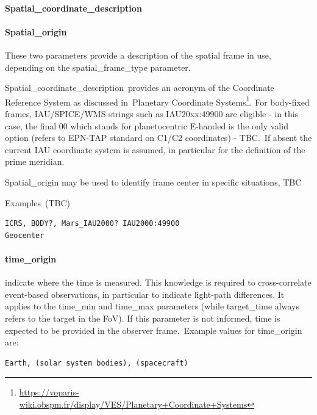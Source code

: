 \documentclass[11pt,a4paper]{ivoa}
\begin{document}
\paragraph{Spatial\_coordinate\_description}

\paragraph{Spatial\_origin}

These two parameters provide a description of the spatial frame in use, depending on the spatial\_frame\_type parameter. 

Spatial\_coordinate\_description provides an acronym of the Coordinate Reference System as discussed in Planetary Coordinate Systems\footnote{\url{https://voparis-wiki.obspm.fr/display/VES/Planetary+Coordinate+Systems}}. For body-fixed frames, IAU/SPICE/WMS strings such as IAU20xx:49900 are eligible - in this case, the final 00 which stands for planetocentric E-handed is the only valid option (refers to EPN-TAP standard on C1/C2 coordinates) - TBC. If absent the current IAU coordinate system is assumed, in particular for the definition of the prime meridian. 

Spatial\_origin may be used to identify frame center in specific situations, TBC

Examples (TBC)






\begin{verbatim}
ICRS, BODY?, Mars_IAU2000? IAU2000:49900
Geocenter
\end{verbatim}




\paragraph{time\_origin}

indicate where the time is measured. This knowledge is required to cross-correlate event-based observations, in particular to indicate light-path differences. It applies to the time\_min and time\_max parameters (while target\_time always refers to the target in the FoV). If this parameter is not informed, time is expected to be provided in the observer frame. Example values for time\_origin are:






\begin{verbatim}
Earth, (solar system bodies), (spacecraft)
\end{verbatim}
\end{document}
